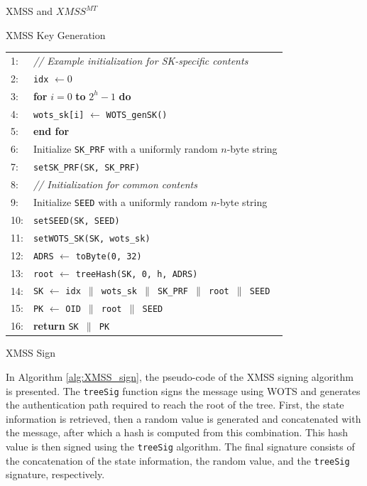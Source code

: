 \documentclass [version=submission]{iacrcc}
\begin{document}
\begin{section}{XMSS and \texorpdfstring{$XMSS^{MT}$}{XMSS MT}}
\begin{subsection}{XMSS Key Generation}
\begin{algorithm}
\begin{tabular}{ll}
1: & \textit{// Example initialization for SK-specific contents} \\
2: & \texttt{idx} $\leftarrow 0$ \\
3: & \textbf{for} $i = 0$ \textbf{to} $2^h - 1$ \textbf{do} \\
4: & \quad \texttt{wots\_sk[i]} $\leftarrow$ \texttt{WOTS\_genSK()} \\
5: & \textbf{end for} \\
6: & Initialize \texttt{SK\_PRF} with a uniformly random $n$-byte string \\
7: & \texttt{setSK\_PRF(SK, SK\_PRF)} \\
8: & \textit{// Initialization for common contents} \\
9: & Initialize \texttt{SEED} with a uniformly random $n$-byte string \\
10: & \texttt{setSEED(SK, SEED)} \\
11: & \texttt{setWOTS\_SK(SK, wots\_sk)} \\
12: & \texttt{ADRS} $\leftarrow$ \texttt{toByte(0, 32)} \\
13: & \texttt{root} $\leftarrow$ \texttt{treeHash(SK, 0, h, ADRS)} \\
14: & \texttt{SK} $\leftarrow$ \texttt{idx $\parallel$ wots\_sk $\parallel$ SK\_PRF $\parallel$ root $\parallel$ SEED} \\
15: & \texttt{PK} $\leftarrow$ \texttt{OID $\parallel$ root $\parallel$ SEED} \\
16: & \textbf{return} \texttt{SK $\parallel$ PK}
\end{tabular}

\end{algorithm}

        
    \end{subsection}

    \begin{subsection}{XMSS Sign}

        In Algorithm \ref{alg:XMSS_sign}, the pseudo-code of the XMSS signing algorithm is presented. The \texttt{treeSig} function signs the message using WOTS and generates the authentication path required to reach the root of the tree. First, the state information is retrieved, then a random value is generated and concatenated with the message, after which a hash is computed from this combination. This hash value is then signed using the \texttt{treeSig} algorithm. The final signature consists of the concatenation of the state information, the random value, and the \texttt{treeSig} signature, respectively.



\end{subsection}
\end{section}
\end{document}
